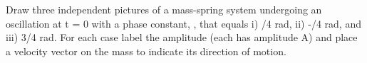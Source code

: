 \label{fnt8.4.2-5}

Draw three independent pictures of a mass-spring system undergoing an oscillation at t = 0 with a phase constant, \phi, that equals i) \pi/4 rad, ii) -\pi/4 rad, and iii) 3\pi/4 rad.  For each case label the amplitude (each has amplitude A) and place a velocity vector on the mass to indicate its direction of motion.